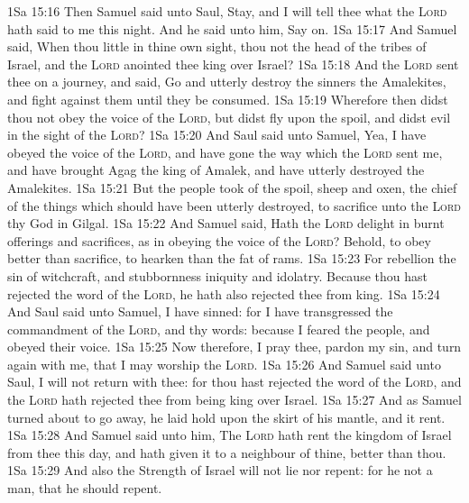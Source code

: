 \vs 1Sa 15:16 Then Samuel said unto Saul, Stay, and I will tell thee what the \textsc{Lord} hath said to me this night. And he said unto him, Say on.
\vs 1Sa 15:17 And Samuel said, When thou  little in thine own sight,  thou not  the head of the tribes of Israel, and the \textsc{Lord} anointed thee king over Israel?
\vs 1Sa 15:18 And the \textsc{Lord} sent thee on a journey, and said, Go and utterly destroy the sinners the Amalekites, and fight against them until they be consumed.
\vs 1Sa 15:19 Wherefore then didst thou not obey the voice of the \textsc{Lord}, but didst fly upon the spoil, and didst evil in the sight of the \textsc{Lord}?
\vs 1Sa 15:20 And Saul said unto Samuel, Yea, I have obeyed the voice of the \textsc{Lord}, and have gone the way which the \textsc{Lord} sent me, and have brought Agag the king of Amalek, and have utterly destroyed the Amalekites.
\vs 1Sa 15:21 But the people took of the spoil, sheep and oxen, the chief of the things which should have been utterly destroyed, to sacrifice unto the \textsc{Lord} thy God in Gilgal.
\vs 1Sa 15:22 And Samuel said, Hath the \textsc{Lord}  delight in burnt offerings and sacrifices, as in obeying the voice of the \textsc{Lord}? Behold, to obey  better than sacrifice,  to hearken than the fat of rams.
\vs 1Sa 15:23 For rebellion  the sin of witchcraft, and stubbornness  iniquity and idolatry. Because thou hast rejected the word of the \textsc{Lord}, he hath also rejected thee from  king.
\vs 1Sa 15:24 And Saul said unto Samuel, I have sinned: for I have transgressed the commandment of the \textsc{Lord}, and thy words: because I feared the people, and obeyed their voice.
\vs 1Sa 15:25 Now therefore, I pray thee, pardon my sin, and turn again with me, that I may worship the \textsc{Lord}.
\vs 1Sa 15:26 And Samuel said unto Saul, I will not return with thee: for thou hast rejected the word of the \textsc{Lord}, and the \textsc{Lord} hath rejected thee from being king over Israel.
\vs 1Sa 15:27 And as Samuel turned about to go away, he laid hold upon the skirt of his mantle, and it rent.
\vs 1Sa 15:28 And Samuel said unto him, The \textsc{Lord} hath rent the kingdom of Israel from thee this day, and hath given it to a neighbour of thine,  better than thou.
\vs 1Sa 15:29 And also the Strength of Israel will not lie nor repent: for he  not a man, that he should repent.
